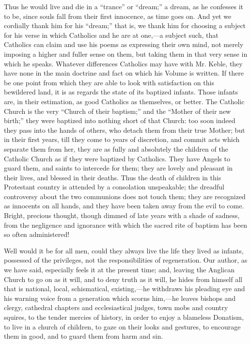 Thus he would live and die in a ``trance'' or ``dream;''
a dream, as he confesses it to be, since souls fall from their first
innocence, as time goes on. And yet we cordially thank him for his ``dream;''
that is, we thank him for choosing a subject for his verse in which
Catholics and he are at one,—a subject such, that Catholics can
claim and use his poems as expressing their own mind, not merely
imposing a higher and fuller sense on them, but taking them in that
very sense in which he speaks. Whatever differences Catholics may have
with Mr. Keble, they have none in the main doctrine and fact on which
his Volume is written. If there be one point from which they are able
to look with satisfaction on this bewildered land, it is as regards
the state of its baptized infants. Those infants are, in their
estimation, as good Catholics as themselves, or better. The Catholic
Church is the very ``Church of their baptism;'' and the ``Mother of their
new birth;'' they were baptized into nothing short of that Church: too
soon indeed they pass into the hands of others, who detach them from
their true Mother; but in their first years, till they come to years
of discretion, and commit acts which separate them from her, they are
as fully and absolutely the children of the Catholic Church as if they
were baptized by Catholics. They have Angels to guard them, and saints
to intercede for them; they are lovely and pleasant in their lives,
and blessed in their deaths. Thus the death of children in this
Protestant country is attended by a consolation unspeakable; the
dreadful controversy about the two communions does not touch them;
they are recognized as innocents on all hands, and they have
been taken away from the evil to come. Bright, precious thought,
though dimmed of late years with a shade of sadness, from the
negligence and ignorance with which the sacred rite of baptism has
been so often administered!

Well would it be for all men, could they always
live the life they lived as infants, possessed of the privileges, not
the responsibilities of regeneration. Our author, as we have said,
especially feels it at the present time; and, leaving the Anglican
Church to go on as it will, and to deny truth as it will, he hides
from himself all that is national, local, schismatical, existing,—he
withdraws his pleading eye and his warning voice from a generation
which scorns him,—he leaves bishops and clergy, cathedral chapters
and ecclesiastical judges, town mobs and country squires, to the
tender mercies of history, in order to enjoy a blameless Donatism, to
live in a church of children, to gaze on their looks and gestures, to
encourage them in good, and to guard them from harm and sin.

